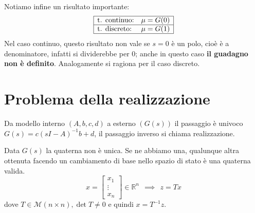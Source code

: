 Notiamo infine un risultato importante:
\begin{equation*}
	\begin{array}{|l c|}
		\hline
		\text{t. continuo:} & \mu =G(0) \\
		\hline
		\text{t. discreto:} & \mu =G(1) \\
		\hline
	\end{array}
\end{equation*}
Nel caso continuo, questo risultato non vale se $s=0$ è un polo, cioè è a denominatore, infatti si dividerebbe per $0$; anche in questo caso \textbf{il guadagno non è definito}. Analogamente si ragiona per il caso discreto.

\section{Problema della realizzazione}

Da modello interno $(A,b,c,d)$ a esterno $(G(s))$ il passaggio è univoco $G(s) =c(sI-A)^{-1} b+d$, il passaggio inverso si chiama realizzazione.

Data $G(s)$ la quaterna non è unica. Se ne abbiamo una, qualunque altra ottenuta facendo un cambiamento di base nello spazio di stato è una quaterna valida.
\begin{equation*}
	x=\begin{bmatrix}
	x_1\\
	\vdots \\
	x_n
	\end{bmatrix} \in \mathbb{R}^n \ \ \implies \ \ z=Tx
\end{equation*}
dove $T\in \mathcal{M}(n\times n) ,\det T\neq 0$ e quindi $x=T^{-1} z$.

